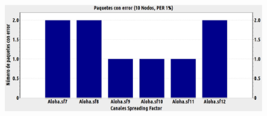 \begin{justify}
\begin{figure}[!ht]
\includegraphics[width=13cm,height=30cm,keepaspectratio]{images/errores10nodos.eps}

\end{figure}
\end{justify}
